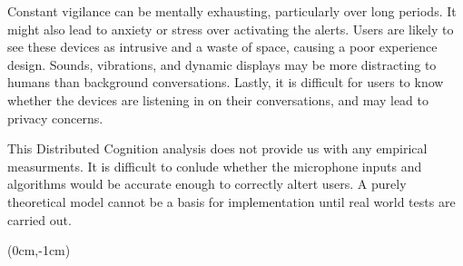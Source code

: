Constant vigilance can be mentally exhausting, particularly over long periods. It might also lead to anxiety or stress over activating the alerts. Users are likely to see these devices as intrusive and a waste of space, causing a poor experience design. Sounds, vibrations, and dynamic displays may be more distracting to humans than background conversations. Lastly, it is difficult for users to know whether the devices are listening in on their conversations, and may lead to privacy concerns.

This Distributed Cognition analysis does not provide us with any empirical measurments. It is difficult to conlude whether the microphone inputs and algorithms would be accurate enough to correctly altert users. A purely theoretical model cannot be a basis for implementation until real world tests are carried out.

\begin{textblock*}{3cm}(0cm,-1cm) %
\end{textblock*}
\restoregeometry
